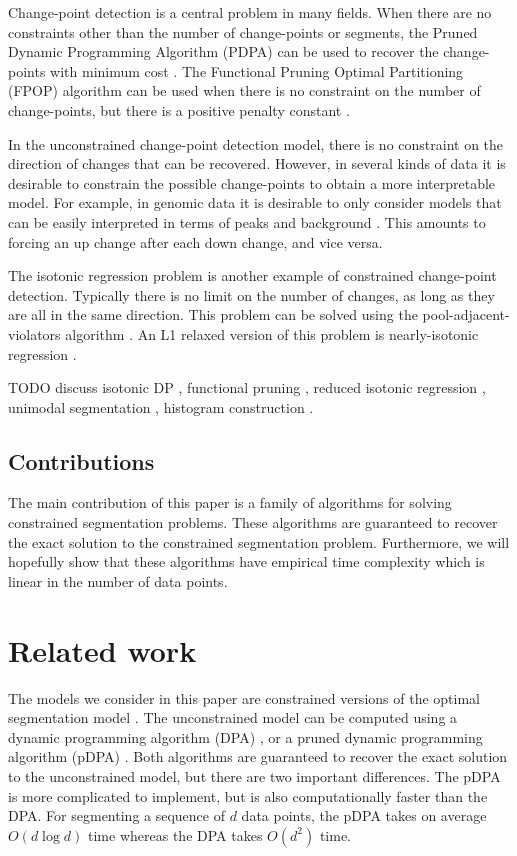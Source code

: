 \documentclass{article}
\begin{document}
Change-point detection is a central problem in many fields. When there
are no constraints other than the number of change-points or segments,
the Pruned Dynamic Programming Algorithm (PDPA) can be used to recover
the change-points with minimum cost \citep{pruned-dp}. The Functional
Pruning Optimal Partitioning (FPOP) algorithm can be used when there
is no constraint on the number of change-points, but there is a
positive penalty constant \citep{FPOP}. 

In the unconstrained change-point detection model, there is no
constraint on the direction of changes that can be recovered. However,
in several kinds of data it is desirable to constrain the possible
change-points to obtain a more interpretable model. For example, in
genomic data it is desirable to only consider models that can be
easily interpreted in terms of peaks and background
\citep{PeakSeg}. This amounts to forcing an up change after each down
change, and vice versa.

The isotonic regression problem is another example of constrained
change-point detection. Typically there is no limit on the number of
changes, as long as they are all in the same direction. This problem
can be solved using the pool-adjacent-violators algorithm
\citep{mair2009isotone}. An L1 relaxed version of this problem is
nearly-isotonic regression \citep{tibshirani2011nearly}.

TODO discuss isotonic DP \citep{isotonic-dp}, functional pruning
\citep{phd-johnson}, reduced isotonic regression
\citep{hardwick2014optimal}, unimodal segmentation
\citep{haiminen2008algorithms}, histogram construction
\citep{halim2009fast}.

\subsection{Contributions}

The main contribution of this paper is a family of algorithms for
solving constrained segmentation problems. These algorithms are
guaranteed to recover the exact solution to the constrained
segmentation problem. Furthermore, we will hopefully show that these algorithms have
empirical time complexity which is linear in the number of data
points.

\section{Related work}
\label{sec:related}

The models we consider in this paper are constrained versions of the
optimal segmentation model \citep{Segmentor}. The
unconstrained model can be computed using a dynamic programming
algorithm (DPA) \citep{bellman}, or a pruned dynamic programming
algorithm (pDPA) \citep{pruned-dp}. Both algorithms are guaranteed to
recover the exact solution to the unconstrained model, but there are
two important differences. The pDPA is more complicated to implement,
but is also computationally faster than the DPA. For segmenting a
sequence of $d$ data points, the pDPA takes on average $O(d\log d)$
time whereas the DPA takes $O(d^2)$ time.
\end{document}
